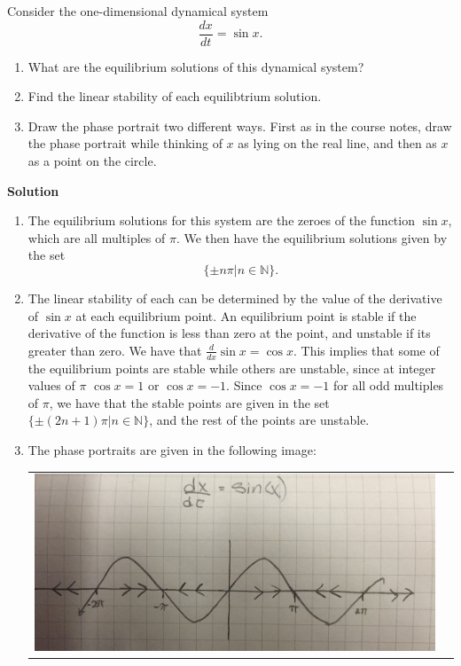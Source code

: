 \documentclass[12pt]{article}
\newenvironment{exercise}[2][Exercise]{\begin{trivlist}
\item[\hskip \labelsep {\bfseries #1}\hskip \labelsep {\bfseries #2.}]}{\end{trivlist}}
\begin{document}
\begin{exercise}{2}
Consider the one-dimensional dynamical system 
$$\frac{dx}{dt} = \sin{x}.$$

\begin{enumerate}
\item[a)] What are the equilibrium solutions of this dynamical system?
\item[b)] Find the linear stability of each equilibtrium solution.
\item[c)] Draw the phase portrait two different ways. First as in the course notes, draw the phase portrait while thinking of $x$ as lying on the real line, and then as $x$ as a point on the circle.
\end{enumerate}

\textbf{Solution}
\\
\begin{enumerate}
	\item[a)]The equilibrium solutions for this system are the zeroes of the function $\sin{x}$, which are all multiples of $\pi$. We then have the equilibrium solutions given by the set $$\{\pm n \pi | n \in \mathbb{N}\}.$$
	\item[b)] The linear stability of each can be determined by the value of the derivative of $\sin{x}$ at each equilibrium point. An equilibrium point is stable if the derivative of the function is less than zero at the point, and unstable if its greater than zero. We have that $\frac{d}{dx}\sin{x} = \cos{x}$. This implies that some of the equilibrium points are stable while others are unstable, since at integer values of $\pi$ $\cos{x} = 1$ or $\cos{x} = -1$. Since $\cos{x} = -1$ for all odd multiples of $\pi$, we have that the stable points are given in the set $\{\pm (2n + 1) \pi | n \in \mathbb{N}\}$, and the rest of the points are unstable.
	\item[c)] The phase portraits are given in the following image:\\
	\begin{tabular}{ll}
	\includegraphics[scale=.05]{phaseportrait2} &

\end{tabular}
\end{enumerate}
\end{exercise}
\end{document}
